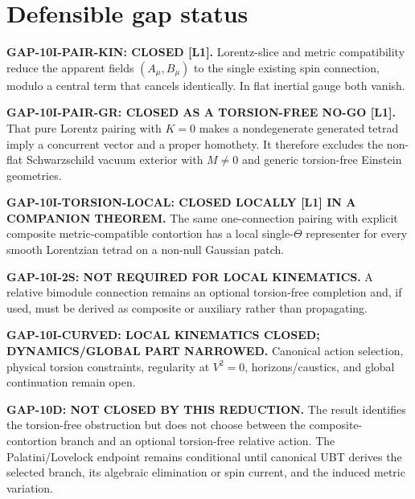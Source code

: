 \documentclass[12pt,a4paper]{article}
\theoremstyle{remark}\newtheorem{remark}[definition]{Remark}
\begin{document}
\section{Defensible gap status}
\begin{tcolorbox}[colback=green!6!white,colframe=green!55!black,title=New exact subclosures]
\textbf{GAP-10I-PAIR-KIN: CLOSED [L1].}
Lorentz-slice and metric compatibility reduce the apparent fields
$(A_\mu,B_\mu)$ to the single existing spin connection, modulo a central term
that cancels identically.  In flat inertial gauge both vanish.

\medskip
\textbf{GAP-10I-PAIR-GR: CLOSED AS A TORSION-FREE NO-GO [L1].}
That pure Lorentz pairing with $K=0$ makes a nondegenerate generated tetrad
imply a concurrent vector and a proper homothety.  It therefore excludes the
non-flat Schwarzschild vacuum exterior with $M\ne0$ and generic torsion-free
Einstein geometries.

\medskip
\textbf{GAP-10I-TORSION-LOCAL: CLOSED LOCALLY [L1] IN A COMPANION THEOREM.}
The same one-connection pairing with explicit composite metric-compatible
contortion has a local single-$\Theta$ representer for every smooth Lorentzian
tetrad on a non-null Gaussian patch.

\medskip
\textbf{GAP-10I-2S: NOT REQUIRED FOR LOCAL KINEMATICS.}
A relative bimodule connection remains an optional torsion-free completion and,
if used, must be derived as composite or auxiliary rather than propagating.

\medskip
\textbf{GAP-10I-CURVED: LOCAL KINEMATICS CLOSED; DYNAMICS/GLOBAL PART
NARROWED.}
Canonical action selection, physical torsion constraints, regularity at
$V^2=0$, horizons/caustics, and global continuation remain open.

\medskip
\textbf{GAP-10D: NOT CLOSED BY THIS REDUCTION.}
The result identifies the torsion-free obstruction but does not choose between
the composite-contortion branch and an optional torsion-free relative action.
The Palatini/Lovelock endpoint remains conditional until canonical UBT derives
the selected branch, its algebraic elimination or spin current, and the
induced metric variation.
\end{tcolorbox}
\end{document}
